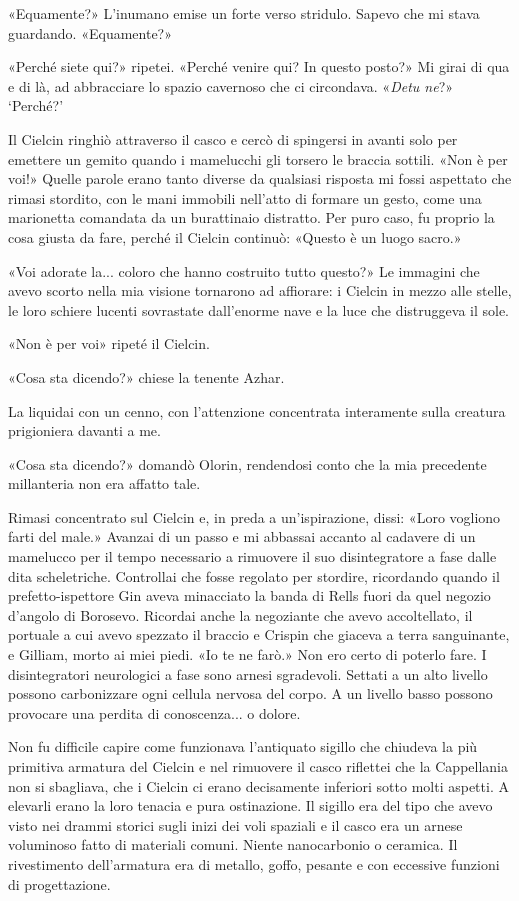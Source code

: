 «Equamente?» L'inumano emise un forte verso stridulo. Sapevo che mi
stava guardando. «Equamente?»

«Perché siete qui?» ripetei. «Perché venire qui? In questo posto?» Mi
girai di qua e di là, ad abbracciare lo spazio cavernoso che ci
circondava. «\emph{Detu ne}?» `Perché?'

Il Cielcin ringhiò attraverso il casco e cercò di spingersi in avanti
solo per emettere un gemito quando i mamelucchi gli torsero le braccia
sottili. «Non è per voi!» Quelle parole erano tanto diverse da qualsiasi
risposta mi fossi aspettato che rimasi stordito, con le mani immobili
nell'atto di formare un gesto, come una marionetta comandata da un
burattinaio distratto. Per puro caso, fu proprio la cosa giusta da fare,
perché il Cielcin continuò: «Questo è un luogo sacro.»

«Voi adorate la... coloro che hanno costruito tutto questo?» Le immagini
che avevo scorto nella mia visione tornarono ad affiorare: i Cielcin in
mezzo alle stelle, le loro schiere lucenti sovrastate dall'enorme nave e
la luce che distruggeva il sole.

«Non è per voi» ripeté il Cielcin.

«Cosa sta dicendo?» chiese la tenente Azhar.

La liquidai con un cenno, con l'attenzione concentrata interamente sulla
creatura prigioniera davanti a me.

«Cosa sta dicendo?» domandò Olorin, rendendosi conto che la mia
precedente millanteria non era affatto tale.

Rimasi concentrato sul Cielcin e, in preda a un'ispirazione, dissi:
«Loro vogliono farti del male.» Avanzai di un passo e mi abbassai
accanto al cadavere di un mamelucco per il tempo necessario a rimuovere
il suo disintegratore a fase dalle dita scheletriche. Controllai che
fosse regolato per stordire, ricordando quando il prefetto-ispettore Gin
aveva minacciato la banda di Rells fuori da quel negozio d'angolo di
Borosevo. Ricordai anche la negoziante che avevo accoltellato, il
portuale a cui avevo spezzato il braccio e Crispin che giaceva a terra
sanguinante, e Gilliam, morto ai miei piedi. «Io te ne farò.» Non ero
certo di poterlo fare. I disintegratori neurologici a fase sono arnesi
sgradevoli. Settati a un alto livello possono carbonizzare ogni cellula
nervosa del corpo. A un livello basso possono provocare una perdita di
conoscenza... o dolore.

Non fu difficile capire come funzionava l'antiquato sigillo che chiudeva
la più primitiva armatura del Cielcin e nel rimuovere il casco riflettei
che la Cappellania non si sbagliava, che i Cielcin ci erano decisamente
inferiori sotto molti aspetti. A elevarli erano la loro tenacia e pura
ostinazione. Il sigillo era del tipo che avevo visto nei drammi storici
sugli inizi dei voli spaziali e il casco era un arnese voluminoso fatto
di materiali comuni. Niente nanocarbonio o ceramica. Il rivestimento
dell'armatura era di metallo, goffo, pesante e con eccessive funzioni di
progettazione.

